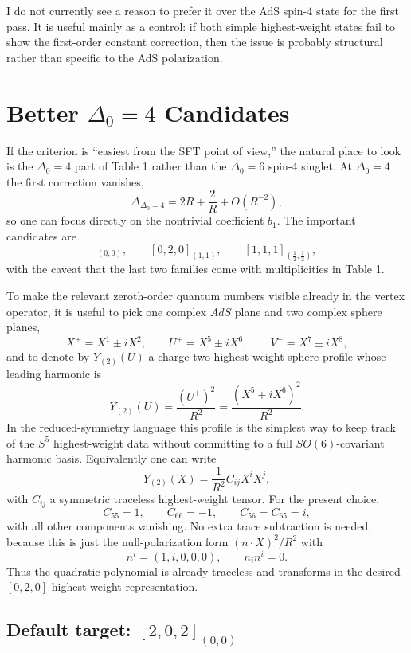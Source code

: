 \documentclass[12pt]{article}
\def\be{\begin{equation}}
\def\ee{\end{equation}}
\newcommand{\D}{\ensuremath{\Delta}}
\begin{document}
I do not currently see a reason to prefer it over the AdS spin-4 state for the first pass.
It is useful mainly as a control: if both simple highest-weight states fail to show the first-order
constant correction, then the issue is probably structural rather than specific to the AdS polarization.

\section{Better \texorpdfstring{$\D_0=4$}{Delta0=4} Candidates}

If the criterion is ``easiest from the SFT point of view,'' the natural place to look is the
$\D_0=4$ part of Table 1 rather than the $\D_0=6$ spin-4 singlet.
At $\D_0=4$ the first correction vanishes,
\be
\D_{\D_0=4}=2R+\frac{2}{R}+O(R^{-2}),
\ee
so one can focus directly on the nontrivial coefficient $b_1$.
The important candidates are
\be
[2,0,2]_{(0,0)},\qquad [0,2,0]_{(1,1)},\qquad [1,1,1]_{(\frac{1}{2},\frac{1}{2})},
\ee
with the caveat that the last two families come with multiplicities in Table 1.

To make the relevant zeroth-order quantum numbers visible already in the vertex operator, it is useful
to pick one complex $AdS$ plane and two complex sphere planes,
\be
X^\pm = X^1 \pm i X^2,\qquad
U^\pm = X^5 \pm i X^6,\qquad
V^\pm = X^7 \pm i X^8,
\ee
and to denote by $Y_{(2)}(U)$ a charge-two highest-weight sphere profile whose leading harmonic is
\be
Y_{(2)}(U)=\frac{(U^+)^2}{R^2}
=\frac{(X^5+iX^6)^2}{R^2}.
\ee
In the reduced-symmetry language this profile is the simplest way to keep track of the $S^5$
highest-weight data without committing to a full $SO(6)$-covariant harmonic basis.
Equivalently one can write
\be
Y_{(2)}(X)=\frac{1}{R^2}C_{ij}X^iX^j,
\ee
with $C_{ij}$ a symmetric traceless highest-weight tensor. For the present choice,
\be
C_{55}=1,\qquad C_{66}=-1,\qquad C_{56}=C_{65}=i,
\ee
with all other components vanishing. No extra trace subtraction is needed, because this is just the
null-polarization form $(n\cdot X)^2/R^2$ with
\be
n^i=(1,i,0,0,0),\qquad n_i n^i=0.
\ee
Thus the quadratic polynomial is already traceless and transforms in the desired $[0,2,0]$
highest-weight representation.

\subsection{Default target: \texorpdfstring{$[2,0,2]_{(0,0)}$}{[2,0,2](0,0)}}
\end{document}
